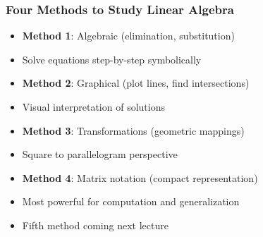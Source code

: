 \begin{frame}[fragile]\frametitle{Four Methods to Study Linear Algebra}
  \begin{itemize}
    \item \textbf{Method 1}: Algebraic (elimination, substitution)
    \item Solve equations step-by-step symbolically
    \item \textbf{Method 2}: Graphical (plot lines, find intersections)
    \item Visual interpretation of solutions
    \item \textbf{Method 3}: Transformations (geometric mappings)
    \item Square to parallelogram perspective
    \item \textbf{Method 4}: Matrix notation (compact representation)
    \item Most powerful for computation and generalization
    \item Fifth method coming next lecture
  \end{itemize}
\end{frame}
